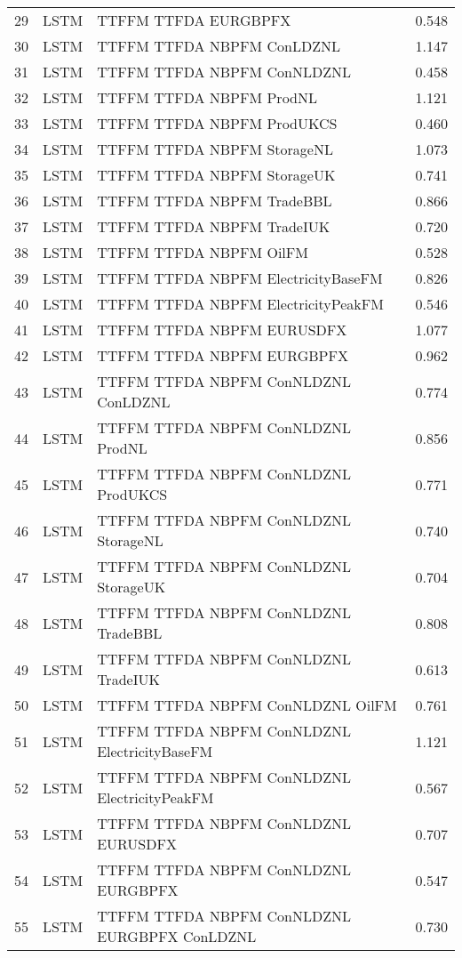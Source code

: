 \begin{table}[ht]
\begin{tabular}{rllr}
  29 & LSTM & TTFFM TTFDA EURGBPFX & 0.548 \\ 
  30 & LSTM & TTFFM TTFDA NBPFM ConLDZNL & 1.147 \\ 
  31 & LSTM & TTFFM TTFDA NBPFM ConNLDZNL & 0.458 \\ 
  32 & LSTM & TTFFM TTFDA NBPFM ProdNL & 1.121 \\ 
  33 & LSTM & TTFFM TTFDA NBPFM ProdUKCS & 0.460 \\ 
  34 & LSTM & TTFFM TTFDA NBPFM StorageNL & 1.073 \\ 
  35 & LSTM & TTFFM TTFDA NBPFM StorageUK & 0.741 \\ 
  36 & LSTM & TTFFM TTFDA NBPFM TradeBBL & 0.866 \\ 
  37 & LSTM & TTFFM TTFDA NBPFM TradeIUK & 0.720 \\ 
  38 & LSTM & TTFFM TTFDA NBPFM OilFM & 0.528 \\ 
  39 & LSTM & TTFFM TTFDA NBPFM ElectricityBaseFM & 0.826 \\ 
  40 & LSTM & TTFFM TTFDA NBPFM ElectricityPeakFM & 0.546 \\ 
  41 & LSTM & TTFFM TTFDA NBPFM EURUSDFX & 1.077 \\ 
  42 & LSTM & TTFFM TTFDA NBPFM EURGBPFX & 0.962 \\ 
  43 & LSTM & TTFFM TTFDA NBPFM ConNLDZNL ConLDZNL & 0.774 \\ 
  44 & LSTM & TTFFM TTFDA NBPFM ConNLDZNL ProdNL & 0.856 \\ 
  45 & LSTM & TTFFM TTFDA NBPFM ConNLDZNL ProdUKCS & 0.771 \\ 
  46 & LSTM & TTFFM TTFDA NBPFM ConNLDZNL StorageNL & 0.740 \\ 
  47 & LSTM & TTFFM TTFDA NBPFM ConNLDZNL StorageUK & 0.704 \\ 
  48 & LSTM & TTFFM TTFDA NBPFM ConNLDZNL TradeBBL & 0.808 \\ 
  49 & LSTM & TTFFM TTFDA NBPFM ConNLDZNL TradeIUK & 0.613 \\ 
  50 & LSTM & TTFFM TTFDA NBPFM ConNLDZNL OilFM & 0.761 \\ 
  51 & LSTM & TTFFM TTFDA NBPFM ConNLDZNL ElectricityBaseFM & 1.121 \\ 
  52 & LSTM & TTFFM TTFDA NBPFM ConNLDZNL ElectricityPeakFM & 0.567 \\ 
  53 & LSTM & TTFFM TTFDA NBPFM ConNLDZNL EURUSDFX & 0.707 \\ 
  54 & LSTM & TTFFM TTFDA NBPFM ConNLDZNL EURGBPFX & 0.547 \\ 
  55 & LSTM & TTFFM TTFDA NBPFM ConNLDZNL EURGBPFX ConLDZNL & 0.730 \\ 

\end{tabular}
\end{table}
